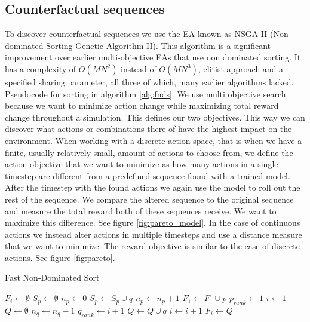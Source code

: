 \documentclass[UKenglish]{uiomasterthesis}
\begin{document}
\subsection{Counterfactual sequences}
\label{sec:counterfactual}
To discover counterfactual sequences we use the EA known as NSGA-II (Non dominated Sorting Genetic Algorithm II). This algorithm is a significant improvement over earlier multi-objective EAs that use non dominated sorting. It has a complexity of $O(MN^2)$ instead of $O(MN^3)$, elitist approach and a specified sharing parameter, all three of which, many earlier algorithms lacked. \cite{Deb2001AFA} Pseudocode for sorting in algorithm \ref{alg:fnds}. 
We use multi objective search because we want to minimize action change while maximizing total reward change throughout a simulation. This defines our two objectives. This way we can discover what actions or combinations there of have the highest impact on the environment. When working with a discrete action space, that is when we have a finite, usually relatively small, amount of actions to choose from, we define the action objective that we want to minimize as how many actions in a single timestep are different from a predefined sequence found with a trained model. After the timestep with the found actions we again use the model to roll out the rest of the sequence. We compare the altered sequence to the original sequence and measure the total reward both of these sequences receive. We want to maximize this difference. See figure \ref{fig:pareto_model}. 
In the case of continuous actions we instead alter actions in multiple timesteps and use a distance measure that we want to minimize. The reward objective is similar to the case of discrete actions. See figure \ref{fig:pareto}.

\begin{algorithm}
\caption{Fast Non-Dominated Sort}
\label{alg:fnds}
\begin{algorithmic}
    \State $F_i \gets \emptyset$
    \State $S_p \gets \emptyset$
    \State $n_p \gets 0$
                \State $S_p \gets S_p \cup q$
                \State $n_p \gets n_p + 1$
            \EndIf
        \EndFor
            \State $F_1 \gets F_1 \cup p$
            \State $p_{rank} \gets 1$
        \EndIf
    \EndFor
    \State $i \gets 1$
        \State $Q \gets \emptyset$
                \State $n_q \gets n_q - 1$
                    \State $q_{rank} \gets i + 1$
                    \State $Q \gets Q \cup q$
                \EndIf
            \EndFor
        \EndFor
        \State $i \gets i + 1$
        \State $F_i \gets Q$
    \EndWhile
\end{algorithmic}
\end{algorithm}
\end{document}
